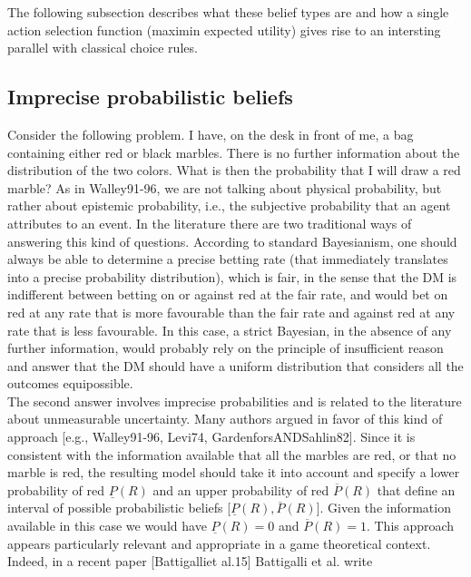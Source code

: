 \documentclass[fleqn,reqno,11pt]{article}
\begin{document}
The following subsection describes what these belief types are and how a single action
selection function (maximin expected utility) gives rise to an intersting parallel with
classical choice rules.


\subsection{Imprecise probabilistic beliefs}
\label{sec:impr-prob-beli}

Consider the following problem. I have, on the desk in front of me, a bag containing either red or black marbles. There is no further information about the distribution of the two colors. What is then the probability that I will draw a red marble? As in Walley91-96, we are not talking about physical probability, but rather about epistemic probability, i.e., the subjective probability that an agent attributes to an event.
In the literature there are two traditional ways of answering this kind of questions. According to standard Bayesianism, one should always be able to determine a precise betting rate (that immediately translates into a precise probability distribution), which is fair, in the sense that the DM is indifferent between betting on or against red at the fair rate, and would bet on red at any rate that is more favourable than the fair rate and against red at any rate that is less favourable. In this case, a strict Bayesian, in the absence of any further information, would probably rely on the principle of insufficient reason and answer that the DM should have a uniform distribution that considers all the outcomes equipossible. \\
The second answer involves imprecise probabilities and is related to the literature about unmeasurable uncertainty. Many authors argued in favor of this kind of approach [e.g., Walley91-96, Levi74, GardenforsANDSahlin82]. Since it is consistent with the information available that all the marbles are red, or that no marble is red, the resulting model should take it into account and specify a lower probability of red $\underline{P}(R)$ and an upper probability of red $\overline{P}(R)$ that define an interval of possible probabilistic beliefs [$\underline{P}(R), \overline{P}(R)$]. Given the information available in this case we would have $\underline{P}(R)=0$ and $\overline{P}(R)=1$. This approach appears particularly relevant and appropriate in a game theoretical context. Indeed, in a recent paper [Battigalliet al.15] Battigalli et al. write
\end{document}
